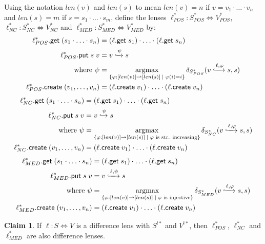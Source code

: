 \documentclass[acmsmall,review,anonymous]{acmart}\settopmatter{printfolios=true,printccs=false,printacmref=false}
\theoremstyle{definition}
\newtheorem{claim}{Claim}
\newcommand{\kw}[1]{\ensuremath{\mathsf{#1}}\xspace}
\newcommand{\get}{\ensuremath{\kw{get}}\xspace}
\newcommand{\pput}{\ensuremath{\kw{put}}\xspace}
\newcommand{\create}{\ensuremath{\kw{create}}\xspace}
\DeclareMathOperator*{\argmax}{argmax}
\begin{document}
Using the notation $len(v)$ and $len(s)$ to mean $len(v) = n$ if $v = v_1 \cdot \ldots \cdot v_n$ and $len(s) = m$ if $s = s_1 \cdot \ldots \cdot s_m$, define the lenses $\ell^*_{POS} : S^*_{POS} \Leftrightarrow V^*_{POS}$, $\ell^*_{NC} : S^*_{NC} \Leftrightarrow V^*_{NC}$ and $\ell^*_{MED} : S^*_{MED} \Leftrightarrow V^*_{MED}$ by:
\begin{align*}
\ell^*_{POS}.\get \; (s_1 \cdot  \ldots \cdot s_n) &= (\ell.\get \; s_1)
\cdot \ldots \cdot (\ell.\get \; s_n)\\
\ell^*_{POS}.\pput \; s \; v
&= v \xhookrightarrow{\psi} s\\
\text{where } \psi &= 
\argmax \limits_{\{\varphi : [len(v)] \rightharpoonup [len(s)] \; | \; \varphi(i) = i\}} \delta_{S^*_{POS}}(v \xhookrightarrow{\ell, \varphi} s, s)\\
\ell^*_{POS}.\create \; (v_1, \ldots, v_n) &= (\ell.\create \;
v_1) \cdot \ldots \cdot (\ell.\create \; v_n)
\end{align*}
\begin{align*}
\ell^*_{NC}.\get \; (s_1 \cdot  \ldots \cdot s_n) &= (\ell.\get \; s_1)
\cdot \ldots \cdot (\ell.\get \; s_n)\\
\ell^*_{NC}.\pput \; s \; v
&= v \xhookrightarrow{\psi} s\\
\text{where } \psi &= 
\argmax \limits_{\{\varphi : [len(v)] \rightharpoonup [len(s)] \; | \; \varphi \text{ is str. increasing}\}} \delta_{S^*_{NC}}(v \xhookrightarrow{\ell, \varphi} s, s) \\
\ell^*_{NC}.\create \; (v_1, \ldots, v_n) &= (\ell.\create \;
v_1) \cdot \ldots \cdot (\ell.\create \; v_n)
\end{align*}
\begin{align*}
\ell^*_{MED}.\get \; (s_1 \cdot  \ldots \cdot s_n) &= (\ell.\get \; s_1)
\cdot \ldots \cdot (\ell.\get \; s_n)\\
\ell^*_{MED}.\pput \; s \; v
&= v \xhookrightarrow{\ell, \psi} s\\
\text{where } \psi &= 
\argmax \limits_{\{\varphi : [len(v)] \rightharpoonup [len(s)] \; | \; \varphi \text{ is injective}\}} \delta_{S^*_{MED}}(v \xhookrightarrow{\ell, \varphi} s, s)\\
\ell^*_{MED}.\create \; (v_1, \ldots, v_n) &= (\ell.\create \;
v_1) \cdot \ldots \cdot (\ell.\create \; v_n)
\end{align*}
\begin{claim}
If $\ell : S \Leftrightarrow V$ is a difference lens with $S^{!*}$ and $V^{!*}$, then $\ell^*_{POS}$, $\ell^*_{NC}$ and $\ell^*_{MED}$ are also difference lenses.
\end{claim}
\end{document}
